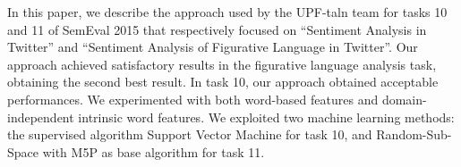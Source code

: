 In this paper, we describe the approach used by the UPF-taln team for tasks 10 and 11 of SemEval 2015 that respectively focused on ``Sentiment Analysis in Twitter'' and ``Sentiment Analysis of Figurative Language in Twitter''. Our approach achieved satisfactory results in the figurative language analysis task, obtaining the second best result. In task 10, our approach obtained acceptable performances. We experimented with both word-based features and domain-independent intrinsic word features. We exploited two machine learning methods: the supervised algorithm Support Vector Machine for task 10, and Random-Sub-Space with M5P as base algorithm for task 11.
